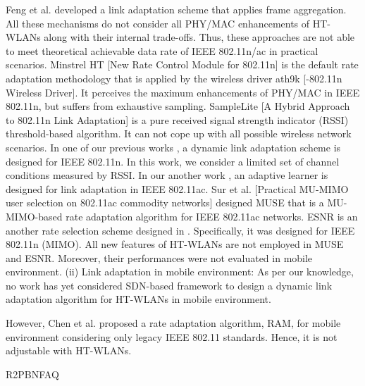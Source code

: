Feng et al.
\cite{feng_frame-aggregated_2010} developed a link adaptation scheme that applies frame aggregation.
All these mechanisms do not consider all PHY/MAC enhancements of HT-WLANs along with their internal trade-offs.
Thus,
	these approaches are not able to meet theoretical achievable data rate of IEEE 802.11n/ac in practical scenarios.
Minstrel HT [New Rate Control Module for 802.11n] is the default rate adaptation methodology that is applied by the wireless driver ath9k [-802.11n Wireless Driver].
It perceives the maximum enhancements of PHY/MAC in IEEE 802.11n,
	but suffers from exhaustive sampling.
SampleLite [A Hybrid Approach to 802.11n Link Adaptation] is a pure received signal strength indicator (RSSI) threshold-based algorithm.
It can not cope up with all possible wireless network scenarios.
In one of our previous works \cite{karmakar_dynamic_2015},
	a dynamic link adaptation scheme is designed for IEEE 802.11n.
In this work,
	we consider a limited set of channel conditions measured by RSSI.
In our another work \cite{karmakar_dynamic_2016},
	an adaptive learner is designed for link adaptation in IEEE 802.11ac.
Sur et al.
[Practical MU-MIMO user selection on 802.11ac commodity networks] designed MUSE that is a MU-MIMO-based rate adaptation algorithm for IEEE 802.11ac networks.
ESNR is an another rate selection scheme designed in \cite{halperin_predictable_2010}.
Specifically,
	it was designed for IEEE 802.11n (MIMO).
All new features of HT-WLANs are not employed in MUSE and ESNR.
Moreover,
	their performances were not evaluated in mobile environment.
(ii) Link adaptation in mobile environment:
	As per our knowledge,
	no work has yet considered SDN-based framework to design a dynamic link adaptation algorithm for HT-WLANs in mobile environment.

However,
	Chen et al.
\cite{chen_ram_2012} proposed a rate adaptation algorithm,
	RAM,
	for mobile environment considering only legacy IEEE 802.11 standards.
Hence,
	it is not adjustable with HT-WLANs.

\cite{bor_lora_2017} R2PBNFAQ

